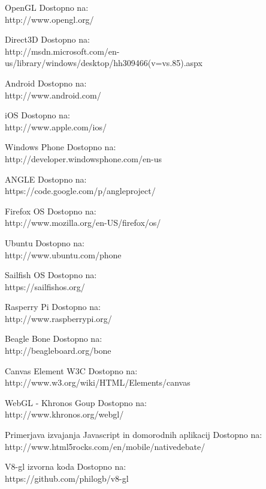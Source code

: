 \begin{thebibliography}{1}


 OpenGL
Dostopno na:\\ http://www.opengl.org/

 Direct3D
Dostopno na:\\ http://msdn.microsoft.com/en-us/library/windows/desktop/hh309466(v=vs.85).aspx

 Android
Dostopno na:\\ http://www.android.com/

 iOS
Dostopno na:\\ http://www.apple.com/ios/

 Windows Phone
Dostopno na:\\ http://developer.windowsphone.com/en-us

 ANGLE
Dostopno na:\\ https://code.google.com/p/angleproject/

 Firefox OS
Dostopno na:\\ http://www.mozilla.org/en-US/firefox/os/

 Ubuntu
Dostopno na:\\ http://www.ubuntu.com/phone

 Sailfish OS
Dostopno na:\\ https://sailfishos.org/

 Rasperry Pi 
Dostopno na:\\ http://www.raspberrypi.org/

 Beagle Bone
Dostopno na:\\ http://beagleboard.org/bone

 Canvas Element W3C 
Dostopno na:\\ http://www.w3.org/wiki/HTML/Elements/canvas

 WebGL - Khronos Goup 
Dostopno na:\\ http://www.khronos.org/webgl/

 Primerjava izvajanja Javascript in domorodnih aplikacij
Dostopno na:\\ http://www.html5rocks.com/en/mobile/nativedebate/

 V8-gl izvorna koda 
Dostopno na:\\ https://github.com/philogb/v8-gl


\end{thebibliography}
